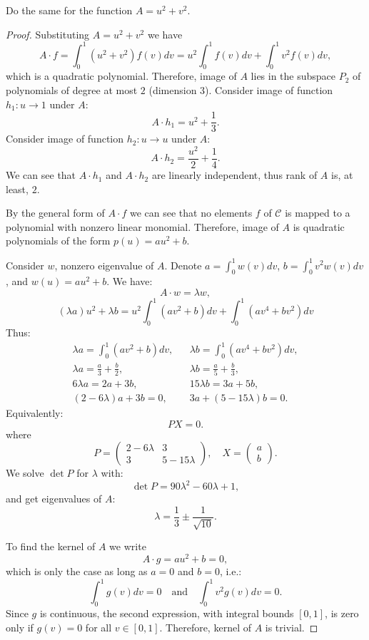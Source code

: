 \documentclass{article}
\theoremstyle{definition}
\begin{document}
\begin{tcolorbox}
Do the same for the function $A = u^2 + v^2$.
\end{tcolorbox}

\begin{proof}

Substituting $A = u^2 + v^2$ we have
\[ A \cdot f = \int_0^1 (u^2+v^2)f(v) dv = u^2 \int_0^1 f(v) dv + \int_0^1 v^2 f(v) dv, \]
which is a quadratic polynomial.
Therefore, image of $A$ lies in the subspace $P_2$ of polynomials of degree at most $2$ (dimension $3$).
Consider image of function $h_1 : u \to 1$ under $A$:
\[ A \cdot h_1 = u^2 + \frac{1}{3}. \]
Consider image of function $h_2 : u \to u$ under $A$:
\[ A \cdot h_2 = \frac{u^2}{2} + \frac{1}{4} . \]
We can see that $A \cdot h_1$ and $A \cdot h_2$ are linearly independent, thus rank of $A$ is, at least, $2$.

By the general form of $A \cdot f$ we can see that no elements $f$ of $\mathcal{C}$ is mapped to a polynomial with nonzero linear monomial.
Therefore, image of $A$ is quadratic polynomials of the form $p(u) = au^2 + b$.

Consider $w$, nonzero eigenvalue of $A$.
Denote $a = \int_0^1 w(v) dv$, $b = \int_0^1 v^2 w(v) dv$, and $w(u) = au^2+b$.
We have:
\[ A \cdot w = \lambda w, \]
\[ (\lambda a) u^2 + \lambda b = u^2 \int_0^1 (av^2 + b) dv + \int_0^1 (av^4 + bv^2) dv \]
Thus:
\begin{align*}
    \lambda a = \int_0^1 (av^2 + b) dv, &&
    \lambda b = \int_0^1 (av^4 + bv^2) dv, \\
    \lambda a = \frac{a}{3} + \frac{b}{2}, &&
    \lambda b = \frac{a}{5} + \frac{b}{3}, \\
    6 \lambda a = 2a + 3b, &&
    15 \lambda b = 3a + 5b, \\
    (2-6\lambda)a + 3b = 0, &&
    3a + (5-15\lambda)b = 0.
\end{align*}
Equivalently:
\[
    P
    X
    = 0.
\]
where 
\[
    P =
    \begin{pmatrix}
        2-6\lambda & 3 \\
        3 & 5-15\lambda
    \end{pmatrix},
    \quad
    X = 
    \begin{pmatrix}
        a \\
        b
    \end{pmatrix}.
\]
We solve $\det P$ for $\lambda$ with:
\[ \det P = 90 \lambda^2 - 60 \lambda + 1, \]
and get eigenvalues of $A$:
\[ \lambda = \frac{1}{3} \pm \frac{1}{\sqrt{10}}. \]

To find the kernel of $A$ we write
\[ A \cdot g = au^2 + b = 0, \]
which is only the case as long as $a = 0$ and $b = 0$, i.e.:
\[ \int_0^1 g(v) dv = 0 \quad \text{and} \quad \int_0^1 v^2 g(v) dv = 0. \]
Since $g$ is continuous, the second expression, with integral bounds $[0,1]$, is zero only if $g(v) = 0$ for all $v \in [0,1]$.
Therefore, kernel of $A$ is trivial.

\end{proof}
\end{document}

